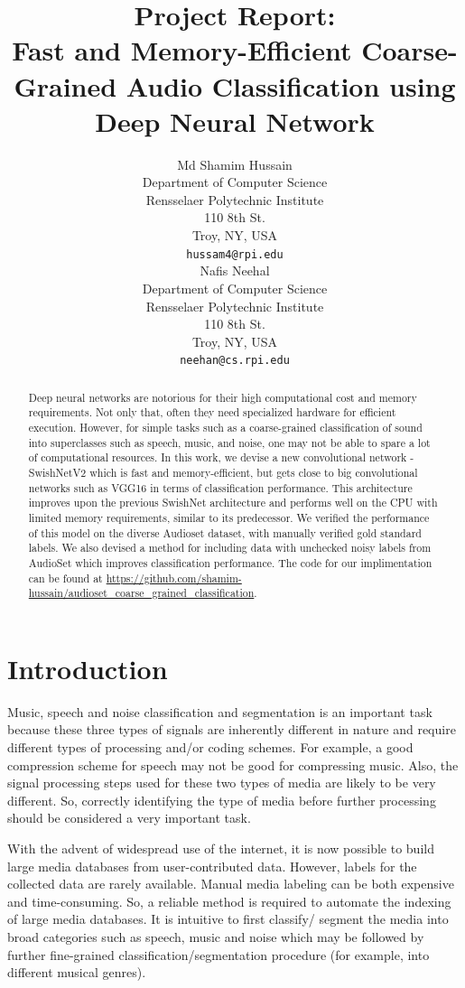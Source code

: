 \documentclass{article}
\title{Project Report:\\Fast and Memory-Efficient Coarse-Grained Audio Classification using Deep Neural Network}
\author{
Md Shamim Hussain\\
Department of Computer Science\\
Rensselaer Polytechnic Institute\\
110 8th St.\\ Troy, NY, USA\\
\texttt{hussam4@rpi.edu} \\
\And
Nafis Neehal\\
Department of Computer Science\\
Rensselaer Polytechnic Institute\\
110 8th St.\\ Troy, NY, USA\\
\texttt{neehan@cs.rpi.edu} \\
}
\begin{document}
\maketitle

\begin{abstract}
  Deep neural networks are notorious for their high computational cost and memory requirements. Not only that, often they need specialized hardware for efficient execution. However, for simple tasks such as a coarse-grained classification of sound into superclasses such as speech, music, and noise, one may not be able to spare a lot of computational resources. In this work, we devise a new convolutional network - SwishNetV2 which is fast and memory-efficient, but gets close to big convolutional networks such as VGG16 in terms of classification performance. This architecture improves upon the previous SwishNet architecture and performs well on the CPU with limited memory requirements, similar to its predecessor. We verified the performance of this model on the diverse Audioset dataset, with manually verified gold standard labels. We also devised a method for including data with unchecked noisy labels from AudioSet which improves classification performance. The code for our implimentation can be found at \url{https://github.com/shamim-hussain/audioset_coarse_grained_classification}.
\end{abstract}

\section{Introduction}
Music, speech and noise classification and segmentation is an important task because these three types of signals are inherently different in nature \cite{Wolfe2002} and require different types of processing and/or coding schemes. For example, a good compression scheme for speech may not be good for compressing music. Also, the signal processing steps used for these two types of media are likely to be very different. So, correctly identifying the type of media before further processing should be considered a very important task. 

With the advent of widespread use of the internet, it is now possible to build large media databases from user-contributed data. However, labels for the collected data are rarely available. Manual media labeling can be both expensive and time-consuming. So, a reliable method is required to automate the indexing of large media databases. It is intuitive to first classify/ segment the media into broad categories such as speech, music and noise which may be followed by further fine-grained classification/segmentation procedure (for example, into different musical genres). 
\end{document}
